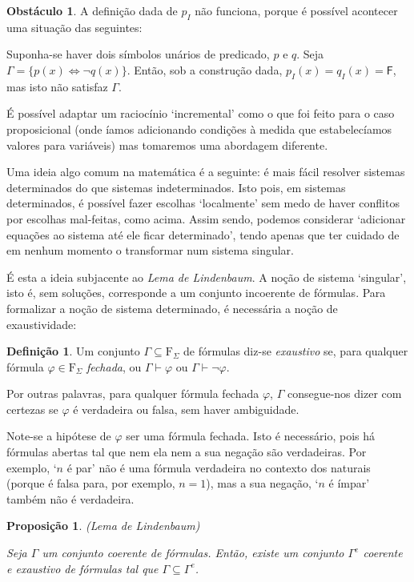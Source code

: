 \documentclass{report}
\newtheorem{prop}{Proposição}
\theoremstyle{definition}
\newtheorem{definicao}{Definição}
\newtheorem{obstaculo}{Obstáculo}
\theoremstyle{remark}
\newcommand{\F}{\mathrm{F}}
\newcommand{\lf}{\mathsf{F}}
\newcommand{\eqv}{\mathbin{\Leftrightarrow}}
\begin{document}
	\begin{obstaculo}
	A definição dada de $p_I$ não funciona, porque é possível acontecer uma situação das seguintes:
	
	Suponha-se haver dois símbolos unários de predicado, $p$ e $q$. Seja $\Gamma = \{p(x) \eqv \neg q(x)\}$. Então, sob a construção dada, $p_I(x) = q_I(x) = \lf$, mas isto não satisfaz $\Gamma$.
	
	É possível adaptar um raciocínio `incremental' como o que foi feito para o caso proposicional (onde íamos adicionando condições à medida que estabelecíamos valores para variáveis) mas tomaremos uma abordagem diferente.
	\end{obstaculo}
	
	Uma ideia algo comum na matemática é a seguinte: é mais fácil resolver sistemas determinados do que sistemas indeterminados. Isto pois, em sistemas determinados, é possível fazer escolhas `localmente' sem medo de haver conflitos por escolhas mal-feitas, como acima. Assim sendo, podemos considerar `adicionar equações ao sistema até ele ficar determinado', tendo apenas que ter cuidado de em nenhum momento o transformar num sistema singular.
	
	É esta a ideia subjacente ao \emph{Lema de Lindenbaum}. A noção de sistema `singular', isto é, sem soluções, corresponde a um conjunto incoerente de fórmulas. Para formalizar a noção de sistema determinado, é necessária a noção de exaustividade:
	
	\begin{definicao}
	Um conjunto $\Gamma \subseteq \F_\Sigma$ de fórmulas diz-se \emph{exaustivo} se, para qualquer fórmula $\varphi \in \F_\Sigma$ \emph{fechada}, ou $\Gamma \vdash \varphi$ ou $\Gamma \vdash \neg \varphi$.
	\end{definicao}
	
	Por outras palavras, para qualquer fórmula fechada $\varphi$, $\Gamma$ consegue-nos dizer com certezas se $\varphi$ é verdadeira ou falsa, sem haver ambiguidade.
	
	Note-se a hipótese de $\varphi$ ser uma fórmula fechada. Isto é necessário, pois há fórmulas abertas tal que nem ela nem a sua negação são verdadeiras. Por exemplo, `$n$ é par' não é uma fórmula verdadeira no contexto dos naturais (porque é falsa para, por exemplo, $n = 1$), mas a sua negação, `$n$ é ímpar' também não é verdadeira.
	
	\begin{prop}
	(Lema de Lindenbaum)
	
	Seja $\Gamma$ um conjunto coerente de fórmulas. Então, existe um conjunto $\Gamma^e$ coerente e exaustivo de fórmulas tal que $\Gamma \subseteq \Gamma^e$.
	\end{prop}
	
\end{document}
